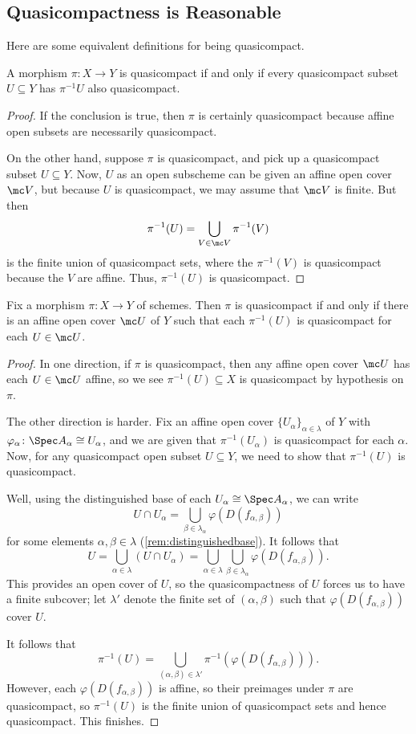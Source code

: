 \documentclass[../notes.tex]{subfiles}
\begin{document}
\subsection{Quasicompactness is Reasonable}
Here are some equivalent definitions for being quasicompact.
\begin{lemma} \label{lem:non-affine-qc}
	A morphism $\pi\colon X\to Y$ is quasicompact if and only if every quasicompact subset $U\subseteq Y$ has $\pi^{-1}U$ also quasicompact.
\end{lemma}
\begin{proof}
	If the conclusion is true, then $\pi$ is certainly quasicompact because affine open subsets are necessarily quasicompact.

	On the other hand, suppose $\pi$ is quasicompact, and pick up a quasicompact subset $U\subseteq Y$. Now, $U$ as an open subscheme can be given an affine open cover $\mc V$, but because $U$ is quasicompact, we may assume that $\mc V$ is finite. But then
	\[\pi^{-1}(U)=\bigcup_{V\in\mc V}\pi^{-1}(V)\]
	is the finite union of quasicompact sets, where the $\pi^{-1}(V)$ is quasicompact because the $V$ are affine. Thus, $\pi^{-1}(U)$ is quasicompact.
\end{proof}
\begin{lemma} \label{lem:mainqclemma}
	Fix a morphism $\pi\colon X\to Y$ of schemes. Then $\pi$ is quasicompact if and only if there is an affine open cover $\mc U$ of $Y$ such that each $\pi^{-1}(U)$ is quasicompact for each $U\in\mc U$.
\end{lemma}
\begin{proof}
	In one direction, if $\pi$ is quasicompact, then any affine open cover $\mc U$ has each $U\in\mc U$ affine, so we see $\pi^{-1}(U)\subseteq X$ is quasicompact by hypothesis on $\pi$.

	The other direction is harder. Fix an affine open cover $\{U_\alpha\}_{\alpha\in\lambda}$ of $Y$ with $\varphi_\alpha\colon\Spec A_\alpha\cong U_\alpha$, and we are given that $\pi^{-1}(U_\alpha)$ is quasicompact for each $\alpha$. Now, for any quasicompact open subset $U\subseteq Y$, we need to show that $\pi^{-1}(U)$ is quasicompact.

	Well, using the distinguished base of each $U_\alpha\cong\Spec A_\alpha$, we can write
	\[U\cap U_\alpha=\bigcup_{\beta\in\lambda_\alpha}\varphi(D(f_{\alpha,\beta}))\]
	for some elements $\alpha,\beta\in\lambda$ (\autoref{rem:distinguishedbase}). It follows that
	\[U=\bigcup_{\alpha\in\lambda}(U\cap U_\alpha)=\bigcup_{\alpha\in\lambda}\bigcup_{\beta\in\lambda_\alpha}\varphi(D(f_{\alpha,\beta})).\]
	This provides an open cover of $U$, so the quasicompactness of $U$ forces us to have a finite subcover; let $\lambda'$ denote the finite set of $(\alpha,\beta)$ such that $\varphi(D(f_{\alpha,\beta}))$ cover $U$.

	It follows that
	\[\pi^{-1}(U)=\bigcup_{(\alpha,\beta)\in\lambda'}\pi^{-1}(\varphi(D(f_{\alpha,\beta}))).\]
	However, each $\varphi(D(f_{\alpha,\beta}))$ is affine, so their preimages under $\pi$ are quasicompact, so $\pi^{-1}(U)$ is the finite union of quasicompact sets and hence quasicompact. This finishes.
\end{proof}
\end{document}
